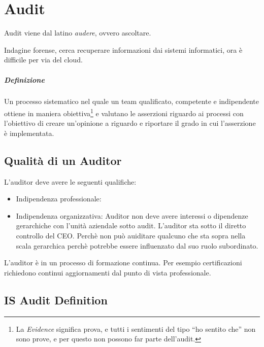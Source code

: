 
\chapter{Audit}

Audit viene dal latino \textit{audere}, ovvero ascoltare.


Indagine forense, cerca recuperare informazioni dai sistemi informatici, ora è 
difficile per via del cloud.





\paragraph*{Definizione}

Un processo sistematico nel quale un team qualificato, competente e 
indipendente 
ottiene in maniera obiettiva\footnote{La \textit{Evidence} significa prova, e 
tutti i sentimenti del tipo ``ho sentito che'' non sono prove, e per questo non 
possono far parte dell'audit.} e valutano le asserzioni riguardo ai processi 
con 
l'obiettivo di creare un'opinione a riguardo e riportare il grado in cui 
l'asserzione è implementata.


\section{Qualità di un Auditor}

L'auditor deve avere le seguenti qualifiche:
\begin{itemize}
\item Indipendenza professionale: 
\item Indipendenza organizzativa: 
Auditor non deve avere interessi o dipendenze gerarchiche con l'unità aziendale 
sotto audit. L'auditor sta sotto il diretto controllo del CEO. Perchè non può 
auiditare qualcuno che sta sopra nella scala gerarchica perchè potrebbe essere 
influenzato dal suo ruolo subordinato.
\end{itemize}


L'auditor è in un processo di formazione continua. Per esempio certificazioni 
richiedono continui aggiornamenti dal punto di vista professionale.







\section{IS Audit Definition}


